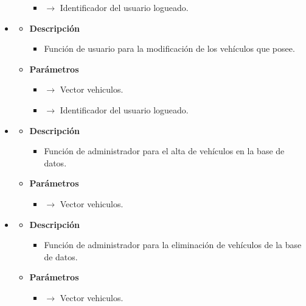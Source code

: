 \begin{itemize}
\begin{itemize}
\begin{itemize}
            \item {} $\rightarrow$ Identificador del usuario logueado.
		\end{itemize}
	\end{itemize}
   \item{}
	\begin{itemize}
		\item \textbf{Descripción}
        \begin{itemize}
			\item Función de usuario para la modificación de los vehículos que posee.
		\end{itemize}
        \item \textbf{Parámetros}
		\begin{itemize}
			\item {} $\rightarrow$ Vector vehiculos.
            \item {} $\rightarrow$ Identificador del usuario logueado.
		\end{itemize}
	\end{itemize}
    \item{}
	\begin{itemize}
		\item \textbf{Descripción}
        \begin{itemize}
			\item Función de administrador para el alta de vehículos en la base de datos.
		\end{itemize}
        \item \textbf{Parámetros}
		\begin{itemize}
			\item {} $\rightarrow$ Vector vehiculos.
         	\end{itemize}
	\end{itemize}
    \item{}
	\begin{itemize}
		\item \textbf{Descripción}
        \begin{itemize}
			\item Función de administrador para la eliminación de vehículos de la base de datos.
		\end{itemize}
        \item \textbf{Parámetros}
		\begin{itemize}
			\item {} $\rightarrow$ Vector vehiculos.

\end{itemize}
\end{itemize}
\end{itemize}
